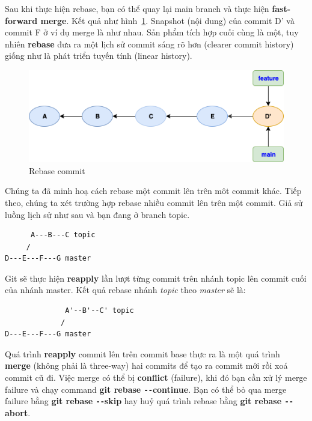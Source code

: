 \documentclass[a4paper, 11pt]{article}
\begin{document}
Sau khi thực hiện rebase, bạn có thể quay lại main branch và thực hiện \textbf{fast-forward merge}. Kết quả như hình~\ref{fig:fast-forward-merge-rebase}. Snapshot (nội dung) của commit D' và commit F ở ví dụ merge là như nhau. Sản phẩm tích hợp cuối cùng là một, tuy nhiên \textbf{rebase} đưa ra một lịch sử commit sáng rõ hơn (clearer commit history) giống như là phát triển tuyến tính (linear history).

\begin{figure}
\centering
\includegraphics[scale=0.6]{git-merge-rebase.png}
\caption{Rebase commit}
\label{fig:fast-forward-merge-rebase}
\end{figure}

Chúng ta đã minh hoạ cách rebase một commit lên trên môt commit khác. Tiếp theo, chúng ta xét trường hợp rebase nhiều commit lên trên một commit. Giả sử luồng lịch sử như sau và bạn đang ở branch topic.

\begin{verbatim}
      A---B---C topic
     /
D---E---F---G master
\end{verbatim}

\noindent Git sẽ thực hiện \textbf{reapply} lần lượt từng commit trên nhánh topic lên commit cuối của nhánh master. Kết quả rebase nhánh \textit{topic} theo \textit{master} sẽ là:

\begin{verbatim}
              A'--B'--C' topic
             /
D---E---F---G master
\end{verbatim}

Quá trình \textbf{reapply} commit lên trên commit base thực ra là một quá trình \textbf{merge} (không phải là three-way) hai commits để tạo ra commit mới rồi xoá commit cũ đi. Việc merge có thể bị \textbf{conflict} (failure), khi đó bạn cần xử lý merge failure và chạy command \textbf{git rebase \texttt{-{}-}continue}. Bạn có thể bỏ qua merge failure bằng \textbf{git rebase \texttt{-{}-}skip} hay huỷ quá trình rebase bằng \textbf{git rebase \texttt{-{}-}abort}.
\end{document}
